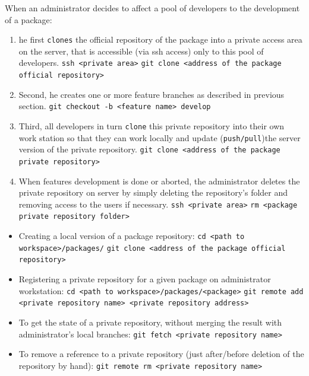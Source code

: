 \documentclass[12pt,a4paper]{article}
\begin{document}
When an administrator decides to affect a pool of developers to the development of a package:
\begin{enumerate}
\item he first \texttt{clones} the official repository of the package into a private access area on the server, that is accessible (via ssh access) only to this pool of developers. 
\linebreak \texttt{ssh <private area>}
\linebreak \texttt{git clone <address of the package official repository>}
\item Second, he creates one or more feature branches as described in previous section.
\linebreak \texttt{git checkout -b <feature name> develop}
\item Third, all developers in turn \texttt{clone} this private repository into their own work station so that they can work locally and update (\texttt{push/pull})the server version of the private repository.
\linebreak \texttt{git clone <address of the package private repository>}
\item When features development is done or aborted, the administrator deletes 
the private repository on server by simply deleting the repository's folder and removing access to the users if necessary.
\linebreak \texttt{ssh <private area>}
\linebreak \texttt{rm <package private repository folder>}
\end{enumerate}
 
\begin{itemize}
\item Creating a local version of a package repository:
\linebreak \texttt{cd <path to workspace>/packages/}
\linebreak \texttt{git clone <address of the package official repository>}
\item Registering a private repository for a given package on administrator workstation:
\linebreak \texttt{cd <path to workspace>/packages/<package>}
\linebreak \texttt{git remote add <private repository name> <private repository address>}
\item To get the state of a private repository, without merging the result with administrator's local branches:
\linebreak \texttt{git fetch <private repository name>}
\item To remove a reference to a private repository (just after/before deletion of the repository by hand):
\linebreak \texttt{git remote rm <private repository name>}
\end{itemize} 
\end{document}
